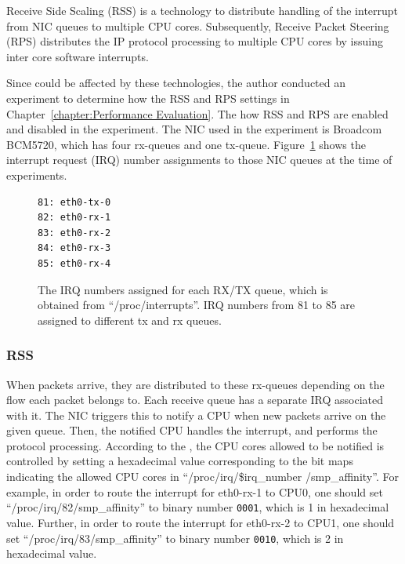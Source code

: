 Receive Side Scaling (RSS) \cite{TomHerbert} is a technology 
to distribute handling of the interrupt from NIC queues to multiple CPU cores.
Subsequently, Receive Packet Steering (RPS) \cite{TomHerbert} distributes the IP protocol processing 
to multiple CPU cores by issuing inter core software interrupts.

Since  could be affected by these technologies,
the author conducted an experiment to determine how  the RSS and RPS settings in Chapter~\ref{chapter:Performance Evaluation}.
The  how RSS and RPS are enabled and disabled in the experiment. 
The NIC used in the experiment is Broadcom BCM5720, which has four rx-queues and one tx-queue.
Figure~\ref{fig:rx-queue} shows the interrupt request (IRQ) number assignments to those NIC queues at the time of experiments.

\begin{figure}[h]
\centering
\begin{minipage}{0.3\columnwidth}
\begin{verbatim}
81: eth0-tx-0
82: eth0-rx-1
83: eth0-rx-2
84: eth0-rx-3
85: eth0-rx-4
\end{verbatim}
\end{minipage}

\par\bigskip
\centering
\begin{minipage}{0.9\columnwidth}
  \caption[The IRQ numbers assigned for each RX/TX queue]{
    The IRQ numbers assigned for each RX/TX queue, which is obtained from \enquote{/proc/interrupts}.
    IRQ numbers from 81 to 85 are assigned to different tx and rx queues.
  }
  \label{fig:rx-queue}
\end{minipage}

\end{figure}

\subsubsection{RSS}

When packets arrive, they are distributed to these rx-queues depending on the flow each packet belongs to.
Each receive queue has a separate IRQ associated with it. The NIC triggers
this to notify a CPU when new packets arrive on the given queue.
Then, the notified CPU handles the interrupt, and performs the protocol processing. 
According to the \cite{TomHerbert}, the CPU cores allowed to be notified is controlled by setting 
a hexadecimal value corresponding to the bit maps indicating the allowed CPU cores in \enquote{/proc/irq/\$irq\_number /smp\_affinity}.
%
For example, in order to route the interrupt for eth0-rx-1 to CPU0, 
one should set \enquote{/proc/irq/82/smp\_affinity} 
to binary number {\tt 0001}, which is 1 in hexadecimal value.
Further, in order to route the interrupt for eth0-rx-2 to CPU1, one 
should set \enquote{/proc/irq/83/smp\_affinity} 
to binary number {\tt 0010}, which is 2 in hexadecimal value.

